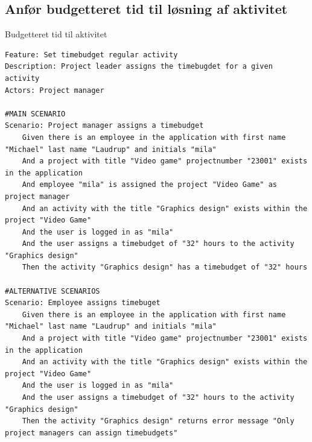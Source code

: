 \subsection{Anfør budgetteret tid til løsning af aktivitet}
\begin{listing}[H]
    \centering
    \caption{Budgetteret tid til aktivitet}\label{lst:budget_time}
    \begin{verbatim}
Feature: Set timebudget regular activity
Description: Project leader assigns the timebugdet for a given activity
Actors: Project manager

#MAIN SCENARIO
Scenario: Project manager assigns a timebudget
    Given there is an employee in the application with first name "Michael" last name "Laudrup" and initials "mila"
    And a project with title "Video game" projectnumber "23001" exists in the application
    And employee "mila" is assigned the project "Video Game" as project manager
    And an activity with the title "Graphics design" exists within the project "Video Game"
    And the user is logged in as "mila"
    And the user assigns a timebudget of "32" hours to the activity "Graphics design"
    Then the activity "Graphics design" has a timebudget of "32" hours

#ALTERNATIVE SCENARIOS
Scenario: Employee assigns timebuget
    Given there is an employee in the application with first name "Michael" last name "Laudrup" and initials "mila"
    And a project with title "Video game" projectnumber "23001" exists in the application
    And an activity with the title "Graphics design" exists within the project "Video Game"
    And the user is logged in as "mila"
    And the user assigns a timebudget of "32" hours to the activity "Graphics design"
    Then the activity "Graphics design" returns error message "Only project managers can assign timebudgets"
    \end{verbatim}
\end{listing}
